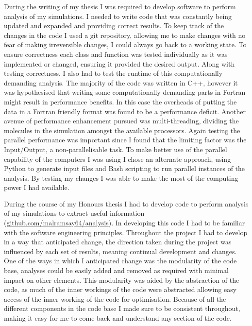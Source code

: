 
During the writing of my thesis I was required to develop software to perform analysis of my simulations. I needed to write code that was constantly being updated and expanded and providing correct results. To keep track of the changes in the code I used a git repository, allowing me to make changes with no fear of making irreversible changes, I could always go back to a working state. To ensure correctness each class and function was tested individually as it was implemented or changed, ensuring it provided the desired output. Along with testing correctness, I also had to test the runtime of this computationally demanding analysis. The majority of the code was written in C++, however it was hypothesised that writing some computationally demanding parts in Fortran might result in performance benefits. In this case the overheads of putting the data in a Fortran friendly format was found to be a performance deficit. Another avenue of performance enhancement pursued was multi-threading, dividing the molecules in the simulation amongst the available processors. Again testing the parallel performance was important since I found that the limiting factor was the Input/Output, a non-parallelisable task. To make better use of the parallel capability of the computers I was using I chose an alternate approach, using Python to generate input files and Bash scripting to run parallel instances of the analysis. By testing my changes I was able to make the most of the computing power I had available.


During the course of my Honours thesis I had to develop code to perform analysis of my simulations to extract useful information (\href{https://github.com/malramsay64/analysis}{github.com/malramsay64/analysis}). In developing this code I had to be familiar with the software engineering principles. Throughout the project I had to develop in a way that anticipated change, the direction taken during the project was influenced by each set of results, meaning continual development and changes. One of the ways in which I anticipated change was the modularity of the code base, analyses could be easily added and removed as required with minimal impact on other elements. This modularity was aided by the abstraction of the code, as much of the inner workings of the code were abstracted allowing easy access of the inner working of the code for optimisation. Because of all the different components in the code base I made sure to be consistent throughout, making it easy for me to come back and understand any section of the code.

